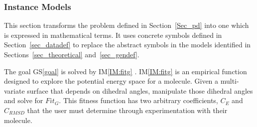 \documentclass[12pt]{article}
\newcommand{\gsref}[1]{GS\ref{#1}}
\newcommand{\iref}[1]{IM\ref{#1}}
\begin{document}
\subsubsection{Instance Models} \label{sec_instance}    

This section transforms the problem defined in Section~\ref{Sec_pd} into 
one which is expressed in mathematical terms. It uses concrete symbols defined 
in Section~\ref{sec_datadef} to replace the abstract symbols in the models 
identified in Sections~\ref{sec_theoretical} and~\ref{sec_gendef}.

The goal \gsref{goal}  is solved by \iref{IM:fitg} 
. \iref{IM:fitg} is an empirical function designed to explore the 
  potential energy space for a molecule. Given a multi-variate surface that 
  depends on dihedral angles, manipulate those dihedral angles and solve for 
  $Fit_G$. This fitness function has two arbitrary coefficients, $C_E$ and 
  $C_{RMSD}$ that the user must determine through experimentation with their 
  molecule. 

~\newline

\end{document}
